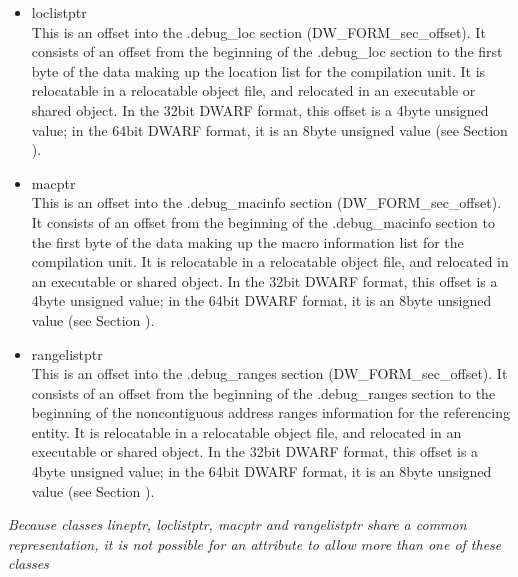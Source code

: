 \begin{itemize}
\item loclistptr \\
This is an offset into the .debug\_loc section
(DW\_FORM\_sec\_offset). It consists of an offset from the
beginning of the .debug\_loc section to the first byte of
the data making up the location list for the compilation
unit. 
It is relocatable in a relocatable object file, and
relocated in an executable or shared object. In the 32\dash bit
DWARF format, this offset is a 4\dash byte unsigned value;
in the 64\dash bit DWARF format, it is an 8\dash byte unsigned value
(see Section ).


\item macptr \\
This is an offset into the .debug\_macinfo section
(DW\_FORM\_sec\_offset). It consists of an offset from the
beginning of the .debug\_macinfo section to the first byte of
the data making up the macro information list for the compilation
unit. 
It is relocatable in a relocatable object file, and
relocated in an executable or shared object. In the 32\dash bit
DWARF format, this offset is a 4\dash byte unsigned value;
in the 64\dash bit DWARF format, it is an 8\dash byte unsigned value
(see Section ).

\item rangelistptr \\
This is an offset into the .debug\_ranges section
(DW\_FORM\_sec\_offset). 
It consists of an
offset from the beginning of the .debug\_ranges section
to the beginning of the non\dash contiguous address ranges
information for the referencing entity.  
It is relocatable in
a relocatable object file, and relocated in an executable or
shared object. In the 32\dash bit DWARF format, this offset
is a 4\dash byte unsigned value; in the 64\dash bit DWARF
format, it is an 8\dash byte unsigned value (see Section
).
\end{itemize}

\textit{Because classes lineptr, loclistptr, macptr and rangelistptr
share a common representation, it is not possible for an
attribute to allow more than one of these classes}


